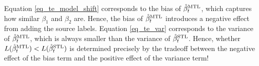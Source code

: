 Equation \eqref{eq_te_model_shift} corresponds to the bias of $\hat{\beta}_t^{\text{MTL}}$, which captures how similar $\beta_1$ and $\beta_2$ are.
Hence, the bias of $\hat{\beta}_t^{\text{MTL}}$ introduces a negative effect from adding the source labels.
Equation \eqref{eq_te_var} corresponds to the variance of $\hat{\beta}_t^{\text{MTL}}$, which is always smaller than the variance of $\hat{\beta}_t^{\text{STL}}$.
Hence, whether $L(\hat{\beta}_t^{\text{MTL}}) < L(\hat{\beta}_t^{\text{STL}})$ is determined precisely by the tradeoff between the negative effect of the bias term and the positive effect of the variance term!






